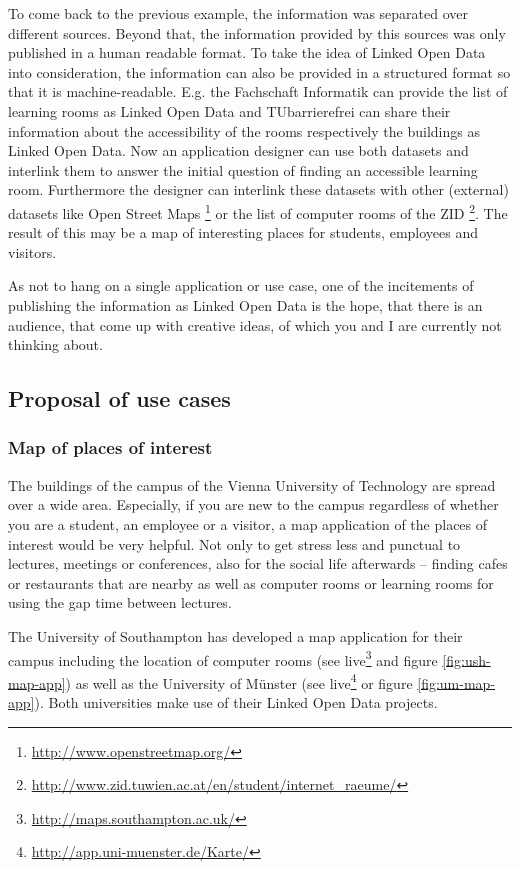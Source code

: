 \documentclass{article}
\begin{document}
To come back to the previous example, the information was separated over different sources. Beyond that, the information provided by this sources was only published in a human readable format. To take the idea of Linked Open Data into consideration, the information can also be provided in a structured format so that it is machine-readable. E.g. the Fachschaft Informatik  can provide the list of learning rooms as Linked Open Data and TUbarrierefrei  can share their information about the accessibility of the rooms respectively the buildings as Linked Open Data. Now an application designer can use both datasets and interlink them to answer the initial question of finding an accessible learning room. Furthermore the designer can interlink these datasets with other (external) datasets like Open Street Maps \footnote{\url{http://www.openstreetmap.org/}} or the list of computer rooms of the ZID \footnote{\url{http://www.zid.tuwien.ac.at/en/student/internet_raeume/}}. The result of this may be a map of interesting places for students, employees and visitors.

As not to hang on a single application or use case, one of the incitements of publishing the information as Linked Open Data is the hope, that there is an audience, that come up with creative ideas, of which you and I are currently not thinking about.

\subsection{Proposal of use cases}
\label{questionaire:usecases}

\subsubsection{Map of places of interest}
\label{questionaire:usecase-place-of-interest}
The buildings of the campus of the Vienna University of Technology are spread over a wide area. Especially, if you are new to the campus regardless of whether you are a student, an employee or a visitor, a map application of the places of interest would be very helpful. Not only to get stress less and punctual to lectures, meetings or conferences, also for the social life afterwards – finding cafes or restaurants that are nearby as well as computer rooms or learning rooms for using the gap time between lectures.
 
The University of Southampton has developed a map application for their campus including the location of computer rooms (see live\footnote{\url{http://maps.southampton.ac.uk/}} and figure \ref{fig:ush-map-app}) as well as the University of Münster (see live\footnote{\url{http://app.uni-muenster.de/Karte/}} or figure \ref{fig:um-map-app}). Both universities make use of their Linked Open Data projects.
\end{document}

